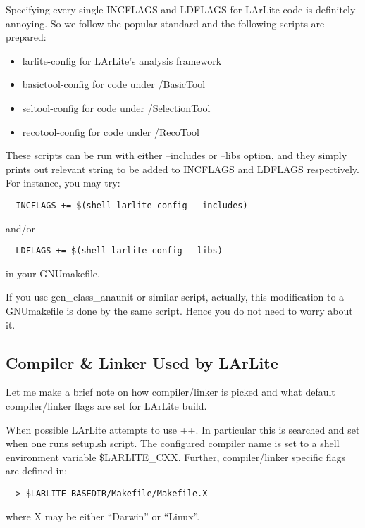 Specifying every single {\ttfamily INCFLAGS} and {\ttfamily LDFLAGS} for LArLite code is definitely annoying.
So we follow the popular standard and the following scripts are prepared:
\begin{itemize}
\item {\ttfamily larlite-config} for LArLite's analysis framework
\item {\ttfamily basictool-config} for code under \UserDev/BasicTool 
\item {\ttfamily seltool-config} for code under \UserDev/SelectionTool
\item {\ttfamily recotool-config} for code under \UserDev/RecoTool
\end{itemize}
These scripts can be run with either {\ttfamily --includes} or {\ttfamily --libs} option, and they
simply prints out relevant string to be added to {\ttfamily INCFLAGS} and {\ttfamily LDFLAGS} respectively.
For instance, you may try:
\begin{lstlisting}
  INCFLAGS += $(shell larlite-config --includes)
\end{lstlisting}
and/or
\begin{lstlisting}
  LDFLAGS += $(shell larlite-config --libs)
\end{lstlisting}
in your {\ttfamily GNUmakefile}.

If you use {\ttfamily gen\_class\_anaunit} or similar script, actually, this modification to a {\ttfamily GNUmakefile} is done
by the same script. Hence you do not need to worry about it.

\subsection{Compiler \& Linker Used by LArLite}
Let me make a brief note on how compiler/linker is picked and what default compiler/linker flags are set for LArLite build.

When possible LArLite attempts to use \clang++. In particular this is searched and set when one runs {\ttfamily setup.sh} script.
The configured compiler name is set to a shell environment variable {\ttfamily \$LARLITE\_CXX}.
Further, compiler/linker specific flags are defined in:
\begin{lstlisting}
  > $LARLITE_BASEDIR/Makefile/Makefile.X
\end{lstlisting}
where {\ttfamily X} may be either ``Darwin'' or ``Linux''. 
